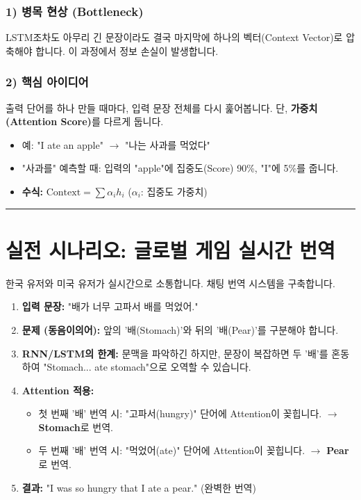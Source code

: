 \documentclass[11pt,a4paper]{book}
\theoremstyle{definition}
\begin{document}
\subsubsection*{1) 병목 현상 (Bottleneck)}
LSTM조차도 아무리 긴 문장이라도 결국 마지막에 하나의 벡터(Context Vector)로 압축해야 합니다. 이 과정에서 정보 손실이 발생합니다.

\subsubsection*{2) 핵심 아이디어}
출력 단어를 하나 만들 때마다, 입력 문장 전체를 다시 훑어봅니다. 단, \textbf{가중치(Attention Score)}를 다르게 둡니다.
\begin{itemize}
    \item 예: "I ate an apple" $\to$ "나는 사과를 먹었다"
    \item "사과를" 예측할 때: 입력의 "apple"에 집중도(Score) 90\%, "I"에 5\%를 줍니다.
    \item \textbf{수식:} $\text{Context} = \sum \alpha_i h_i$ ($\alpha_i$: 집중도 가중치)
\end{itemize}

\vspace{0.5cm}\hrule\vspace{0.5cm}

\section{실전 시나리오: 글로벌 게임 실시간 번역}

\begin{storybox}[title={Scenario: '메이플스토리 월드' 글로벌 채팅}]
한국 유저와 미국 유저가 실시간으로 소통합니다. 채팅 번역 시스템을 구축합니다.
\end{storybox}

\begin{enumerate}
    \item \textbf{입력 문장:} "배가 너무 고파서 배를 먹었어."
    \item \textbf{문제 (동음이의어):} 앞의 '배(Stomach)'와 뒤의 '배(Pear)'를 구분해야 합니다.
    \item \textbf{RNN/LSTM의 한계:} 문맥을 파악하긴 하지만, 문장이 복잡하면 두 '배'를 혼동하여 "Stomach... ate stomach"으로 오역할 수 있습니다.
    \item \textbf{Attention 적용:}
    \begin{itemize}
        \item 첫 번째 '배' 번역 시: "고파서(hungry)" 단어에 Attention이 꽂힙니다. $\to$ \textbf{Stomach}로 번역.
        \item 두 번째 '배' 번역 시: "먹었어(ate)" 단어에 Attention이 꽂힙니다. $\to$ \textbf{Pear}로 번역.
    \end{itemize}
    \item \textbf{결과:} "I was so hungry that I ate a pear." (완벽한 번역)
\end{enumerate}
\end{document}
